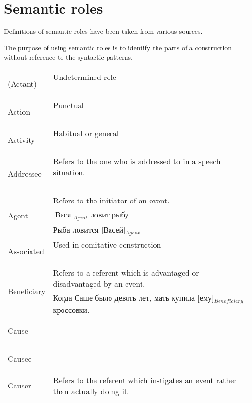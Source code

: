 \documentclass[a4paper,11pt, onecolumn,twoside]{article}
\begin{document}
\section{Semantic roles}
\label{sec:semroles}

Definitions of semantic roles have been taken from various sources.

The purpose of using semantic roles is to identify the parts of a construction without
reference to the syntactic patterns. 

\begin{longtable}{ p{}  p{} } 
\toprule
 \multirow{2}{*}{(Actant)} & Undetermined role \\ 
        & ~ \\
\midrule
 \multirow{2}{*}{Action} & Punctual  \\ 
        & ~ \\
\midrule
 \multirow{2}{*}{Activity} & Habitual or general \\ 
        & ~ \\
\midrule
 \multirow{2}{*}{Addressee} & Refers to the one who is addressed to in a speech situation. \\ 
        & ~ \\
\midrule
 \multirow{3}{*}{Agent} & Refers to the initiator of an event. \\ 
        & [Вася]$_{Agent}$ ловит рыбу. \\
        & Рыба ловится [Васей]$_{Agent}$ \\
\midrule
 \multirow{2}{*}{Associated} & Used in comitative construction \\ 
        & ~ \\
\midrule
 \multirow{2}{*}{Beneficiary} & Refers to a referent which is advantaged or disadvantaged by an event. \\ 
        & Когда Саше было девять лет, мать купила [ему]$_{Beneficiary}$ кроссовки. \\
\midrule
 \multirow{2}{*}{Cause} & ~ \\ 
        & ~ \\
\midrule
 \multirow{2}{*}{Causee} & ~ \\ 
        & ~ \\
\midrule
 \multirow{2}{*}{Causer} & Refers to the referent which instigates an event rather than actually doing it. \\ 

\end{longtable}
\end{document}

